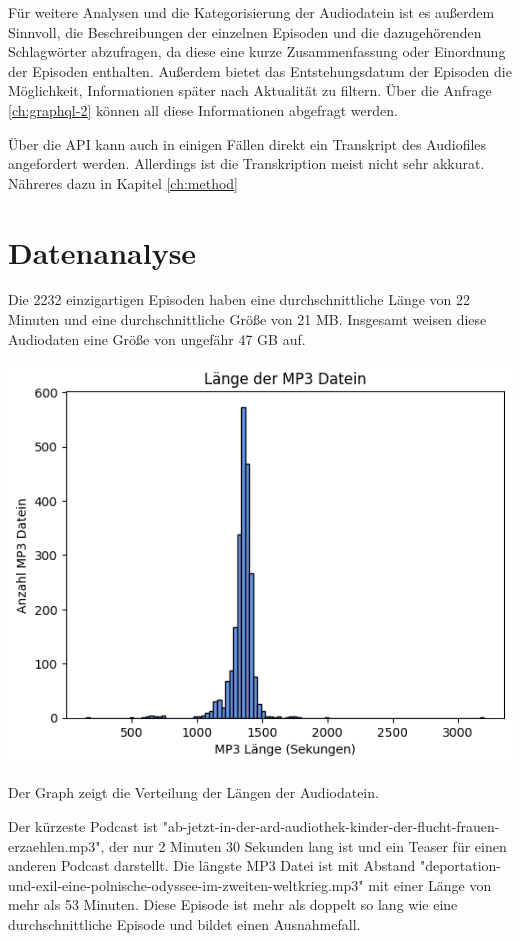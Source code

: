 Für weitere Analysen und die Kategorisierung der Audiodatein ist es außerdem Sinnvoll, die Beschreibungen der einzelnen Episoden und die dazugehörenden Schlagwörter abzufragen, da diese eine kurze Zusammenfassung oder Einordnung der Episoden enthalten.
Außerdem bietet das Entstehungsdatum der Episoden die Möglichkeit, Informationen später nach Aktualität zu filtern.
Über die Anfrage \autoref{ch:graphql-2} können all diese Informationen abgefragt werden.

Über die API kann auch in einigen Fällen direkt ein Transkript des Audiofiles angefordert werden. 
Allerdings ist die Transkription meist nicht sehr akkurat.
Nähreres dazu in Kapitel \autoref{ch:method}


\section{Datenanalyse}


Die 2232 einzigartigen Episoden haben eine durchschnittliche Länge von 22 Minuten und eine durchschnittliche Größe von 21 MB.
Insgesamt weisen diese Audiodaten eine Größe von ungefähr 47 GB auf. 

\includegraphics[width=\linewidth]{figures/mp3_length.png}

Der Graph zeigt die Verteilung der Längen der Audiodatein.

Der kürzeste Podcast ist "ab-jetzt-in-der-ard-audiothek-kinder-der-flucht-frauen-erzaehlen.mp3", der nur 2 Minuten 30 Sekunden lang ist und ein Teaser für einen anderen Podcast darstellt.
Die längste MP3 Datei ist mit Abstand "deportation-und-exil-eine-polnische-odyssee-im-zweiten-weltkrieg.mp3" mit einer Länge von mehr als 53 Minuten.
Diese Episode ist mehr als doppelt so lang wie eine durchschnittliche Episode und bildet einen Ausnahmefall.

